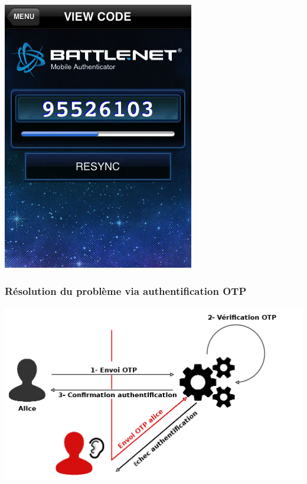 \documentclass[xcolor=table]{beamer}
\begin{document}
\begin{frame}
\begin{center}
\includegraphics[scale=0.405]{../graphics/blizzardauth.jpg}
\end{center}
\end{frame}

\begin{frame}
\frametitle{Résolution du problème via authentification OTP}
\includegraphics[scale=0.24]{../graphics/authsimple2.png}
\end{frame}
\end{document}
